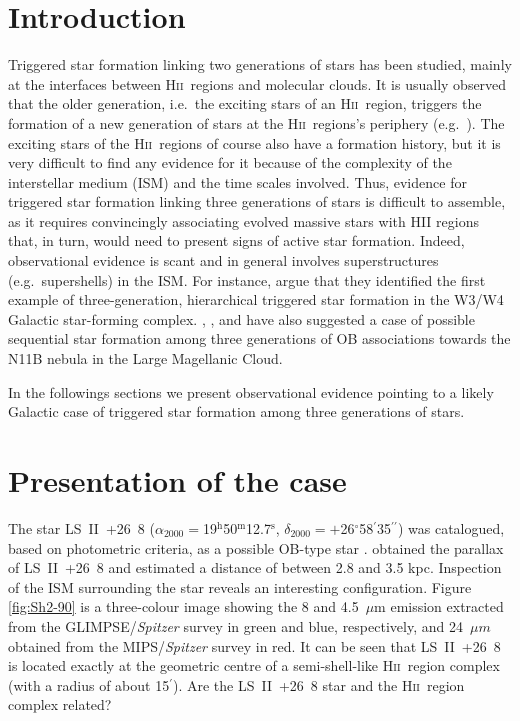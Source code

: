 \documentclass[fleqn,usenatbib]{mnras}
\def\d{$^\circ$}
\def\m{$^\prime$}
\def\s{$^{\prime\prime}$}
\def\hh{$^{\mathrm h}$}
\def\mm{$^{\mathrm m}$}
\def\ss{$^{\mathrm s}$}
\def\hii{H\textsc{ii}}
\begin{document}
\section{Introduction}


Triggered star formation linking two generations of stars has been studied, 
mainly at the interfaces between \hii~regions and molecular clouds.  It is usually 
observed that the older generation, i.e.\ the exciting stars of an \hii~region, 
triggers the formation of a new generation of stars at the \hii~regions's periphery 
(e.g.\ \citealt{duro17,deha15,zav10,zav07}). The exciting stars of the \hii~regions 
of course also have a formation history, but it is very difficult to find any evidence for it 
because of the complexity of the interstellar medium (ISM) and the time scales involved. 
Thus, evidence for triggered star formation linking three generations of stars is 
difficult to assemble, as it requires convincingly associating evolved massive stars with HII regions that,
in turn, would need to present signs of active star formation.
Indeed, observational evidence is scant and in general involves superstructures 
(e.g.\ supershells) in the ISM. For instance, \citet{oey05} argue that they identified the 
first example of three-generation, hierarchical triggered star formation in the W3/W4 Galactic 
star-forming complex. \citet{parker92}, \citet{wal92}, and 
\citet{barba03} have also suggested a case of possible sequential star formation among three 
generations of OB associations towards the N11B nebula in the Large Magellanic Cloud.  


In the followings sections we present observational evidence pointing to a likely 
Galactic case of triggered star formation among three generations of stars.

\section{Presentation of the case}\label{sec.present}

The star LS~II~+26~8 ($\alpha_{2000}$$=$19\hh50\mm12.7\ss, $\delta_{2000}$$=+$26\d58\m35\s) was catalogued, 
based on photometric criteria, as a possible OB-type star 
\citep{1960LS....C02....0S}. \citet{2018AJ....156...58B} obtained the parallax of LS~II~+26~8 and
estimated a distance of between 2.8 and 3.5 kpc. Inspection of the ISM surrounding the 
star reveals an interesting configuration. Figure\,\ref{fig:Sh2-90} is a three-colour 
image showing the 8 and 4.5~$\mu$m emission extracted from the GLIMPSE/{\it Spitzer} 
survey in green and blue, respectively, and 24~$\mu m$ obtained from the MIPS/{\it Spitzer} 
survey in red. It can be seen that LS~II~+26~8 is located exactly at the geometric 
centre of a semi-shell-like H\textsc{ii}~region complex (with a radius of about 15\m). 
Are the LS~II~+26~8 star and the \hii~region complex related?
\end{document}
